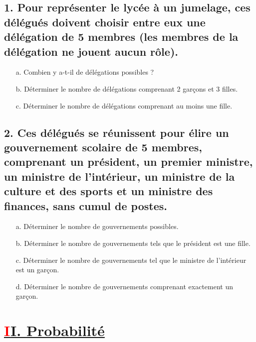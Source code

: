 \documentclass[12pt]{article}
\begin{document}
\subsection*{1. Pour représenter le lycée à un jumelage, ces délégués doivent choisir entre eux une délégation de 5 membres (les membres de la délégation ne jouent aucun rôle).}
\begin{enumerate}
    \item[a.] Combien y a-t-il de délégations possibles ? \\
    
    \item[b.] Déterminer le nombre de délégations comprenant 2 garçons et 3 filles. \\
    
    \item[c.] Déterminer le nombre de délégations comprenant au moins une fille. \\
\end{enumerate}

\subsection*{2. Ces délégués se réunissent pour élire un gouvernement scolaire de 5 membres, comprenant un président, un premier ministre, un ministre de l’intérieur, un ministre de la culture et des sports et un ministre des finances, sans cumul de postes.}
\begin{enumerate}
    \item[a.] Déterminer le nombre de gouvernements possibles. \\
    
    \item[b.] Déterminer le nombre de gouvernements tels que le président est une fille. \\
    
    \item[c.] Déterminer le nombre de gouvernements tel que le ministre de l’intérieur est un garçon. \\
    
    \item[d.] Déterminer le nombre de gouvernements comprenant exactement un garçon. \\
\end{enumerate}
\section*{\underline{\textbf{\textcolor{red}II. Probabilité}}}
\end{document}
